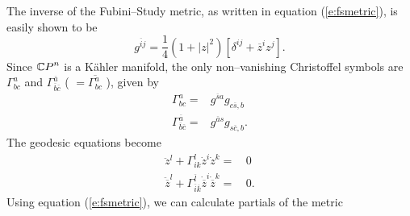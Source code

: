 The inverse of the Fubini--Study metric, as written in
equation (\ref{e:fsmetric}), is easily shown to be
\begin{equation}
g^{\overline{i}j} = \frac{1}{4}\left( 
                    1+\left| z\right|^2 
                \right) \left[
                    \delta^{ij} + \overline{z}^iz^j
                \right].
\label{e:fsinvmetric}
\end{equation}
Since ${\mathbb{C} P}^n$ is a K\"ahler manifold\cite{Nakahara:90}, 
the only non--vanishing Christoffel symbols are $\Gamma^a_{bc}$ and
$\Gamma^{\overline{a}}_{\overline{b}\overline{c}}$ ( $=\overline{\Gamma^a_{bc}}$ ), 
given by
\begin{equation}
\begin{split}
    \Gamma^a_{bc} =& g^{\overline{s}a} g_{c\overline{s},b}\\
    \Gamma^{\overline{a}}_{\overline{b}\overline{c}} =& g^{\overline{a}s} 
                            g_{s\overline{c},b}.
\end{split}
\label{e:xsymb}
\end{equation}
The geodesic equations become
\begin{equation}
\begin{split}
    \ddot{z}^l + \Gamma^l_{ik}\dot{z}^i\dot{z}^k =&\, 0\\
    \ddot{\overline{z}}^l + \Gamma^{\overline{l}}_{\overline{i}\overline{k}}
            \dot{\overline{z}}^i\dot{\overline{z}}^k =&\, 0.
\end{split}
\label{e:geodesics}
\end{equation}
Using equation (\ref{e:fsmetric}), we can calculate partials of the metric 
